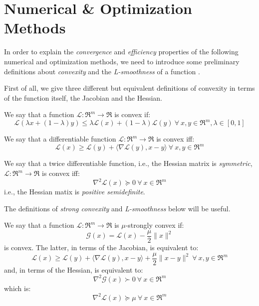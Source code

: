 \section{Numerical \& Optimization Methods}

In order to explain the \emph{convergence} and \emph{efficiency} properties of the following numerical and optimization methods, we need to introduce some preliminary definitions about \emph{convexity} and the \emph{L-smoothness} of a function \cite{boyd2004convex}.

First of all, we give three different but equivalent definitions of convexity in terms of the function itself, the Jacobian and the Hessian.

\begin{definition}[Convexity] \label{def:convexity}
We say that a function $\mathcal{L}: \Re^m \rightarrow \Re$ is convex if: 
$$ 
\mathcal{L}(\lambda x + (1 - \lambda) y ) \leq \lambda \mathcal{L}(x) + (1 - \lambda) \mathcal{L}(y) \ \forall \ x, y \in \Re^m, \lambda \in [0,1] 
$$
\end{definition}

\begin{definition} \label{def:convexity_jac}
We say that a differentiable function $\mathcal{L}: \Re^m \rightarrow \Re$ is convex iff: 
$$
\mathcal{L}(x) \geq \mathcal{L}(y) + \langle \nabla \mathcal{L}(y), x - y \rangle \ \forall \ x, y \in \Re^m
$$
\end{definition}

\begin{definition} \label{def:convexity_hess}
We say that a twice differentiable function, i.e., the Hessian matrix is \emph{symmetric}, $\mathcal{L}: \Re^m \rightarrow \Re$ is convex iff: 
$$
\nabla^2 \mathcal{L}(x) \succeq 0 \ \forall \ x \in \Re^m
$$
i.e., the Hessian matix is \emph{positive semidefinite}.
\end{definition}

The definitions of \emph{strong convexity} and \emph{L-smoothness} below will be useful.

\begin{definition} \label{def:strong_convexity}
We say that a function $\mathcal{L}: \Re^m \rightarrow \Re$ is $\mu$-strongly convex if:
$$
\mathcal{G}(x) = \mathcal{L}(x) - \frac{\mu}{2} \| x \|^2
$$
is convex. The latter, in terms of the Jacobian, is equivalent to:
$$
\mathcal{L}(x) \geq \mathcal{L}(y) + \langle \nabla \mathcal{L}(y), x - y \rangle + \frac{\mu}{2} \| x - y \|^2 \ \forall \ x, y \in \Re^m
$$
and, in terms of the Hessian, is equivalent to:
$$
\nabla^2 \mathcal{G}(x) \succ 0 \ \forall \ x \in \Re^m
$$
which is:
$$
\nabla^2 \mathcal{L}(x) \succeq \mu \ \forall \ x \in \Re^m
$$
\end{definition}

